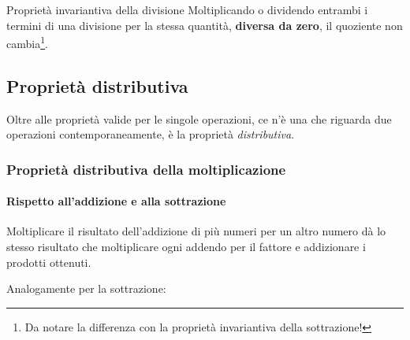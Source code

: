 \begin{definizione}{Proprietà invariantiva della divisione}{}
Moltiplicando o dividendo entrambi i termini di una divisione per 
la stessa quantità, \textbf{diversa da zero}, 
il quoziente non cambia\footnote{
Da notare la differenza con la proprietà invariantiva della sottrazione!}.
\end{definizione}

\subsection{Proprietà distributiva}

Oltre alle proprietà valide per le singole operazioni, ce n'è una che 
riguarda due operazioni contemporaneamente, è la proprietà 
\emph{distributiva}.

\subsubsection{Proprietà distributiva della moltiplicazione}

\paragraph{Rispetto all'addizione e alla sottrazione}
Moltiplicare il risultato dell'addizione di più numeri per un altro 
numero dà lo stesso risultato che moltiplicare ogni addendo per il 
fattore e addizionare i prodotti ottenuti. 


Analogamente per la sottrazione:



